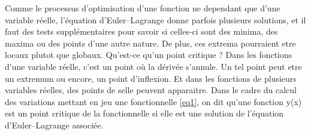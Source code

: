 \documentclass[10pt,a4paper]{article}%
\theoremstyle{theorem}
\theoremstyle{definition}
\begin{document}
			Comme le processus d'optimisation d'une fonction ne dependant que d'une variable réelle, l'équation d'Euler–Lagrange donne parfois plusieurs solutions, et il faut des tests supplémentaires pour savoir si celles-ci sont des minima, des maxima ou des points d'une autre nature. De plus, ces extrema pourraient etre locaux plutot que globaux. Qu'est-ce qu'un point critique ? Dans les fonctions d'une variable réelle, c’est un point où la dérivée s'annule. Un tel point peut etre un extremum ou encore, un point d'inflexion. Et dans les fonctions de plusieurs variables réelles, des points de selle peuvent apparaitre. Dans le cadre du calcul des variations mettant en jeu une fonctionnelle \eqref{eq1}, on dit qu'une fonction y(x) est un point critique de la fonctionnelle si elle est une solution de l'équation d'Euler–Lagrange associée.
			
\end{document}
